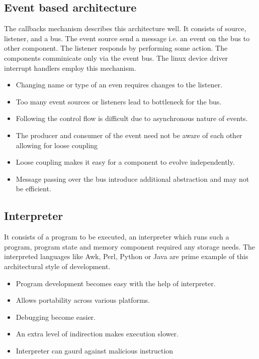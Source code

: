 \documentclass[conference]{IEEEtran}
\begin{document}
\subsection{Event based architecture}
The callbacks mechanism describes this architecture well. It consists of source, listener, and a bus. The event source send a message i.e. an event on the bus to other component. The listener responds by performing some action. The components comminicate only via the event bus. The linux device driver interrupt handlers employ this mechanism. 
\begin{itemize}
\item Changing name or type of an even requires changes to the listener.
\item Too many event sources or listeners lead to bottleneck for the bus.
\item Following the control flow is difficult due to asynchronous nature of events.
\item The producer and consumer of the event need not be aware of each other allowing for loose coupling
\item Loose coupling makes it easy for a component to evolve independently.
\item Message passing over the bus introduce additional abstraction and may not be efficient.
\end{itemize}

\subsection{Interpreter}
It consists of a program to be executed, an interpreter which runs such a program, program state and memory component required any storage needs. The interpreted languages like Awk, Perl, Python or Java are prime example of this architectural style of development.
\begin{itemize}
\item Program development becomes easy with the help of interpreter.
\item Allows portability across various platforms.
\item Debugging become easier.
\item An extra level of indirection makes execution slower.
\item Interpreter can gaurd against malicious instruction 
\end{itemize}
\end{document}
